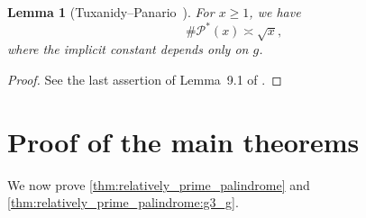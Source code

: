 \documentclass{amsart}
\theoremstyle{plain}
\newtheorem{lemma}[theorem]{Lemma}
\theoremstyle{definition}
\begin{document}
\begin{lemma}[{Tuxanidy--Panario~\cite{TuxanidyPanario}}]
\label{lem:P_ast_size}
For $x\ge1$, we have
\[
\#\mathscr{P}^{\ast}(x)\asymp\sqrt{x},
\]
where the implicit constant depends only on $g$.
\end{lemma}
\begin{proof}
See the last assertion of Lemma~9.1
of \cite{TuxanidyPanario}.
\end{proof}

\section{Proof of the main theorems}
\label{sec:proof_mainthm}
We now prove \cref{thm:relatively_prime_palindrome}
and \cref{thm:relatively_prime_palindrome:g3_g}.
\end{document}
